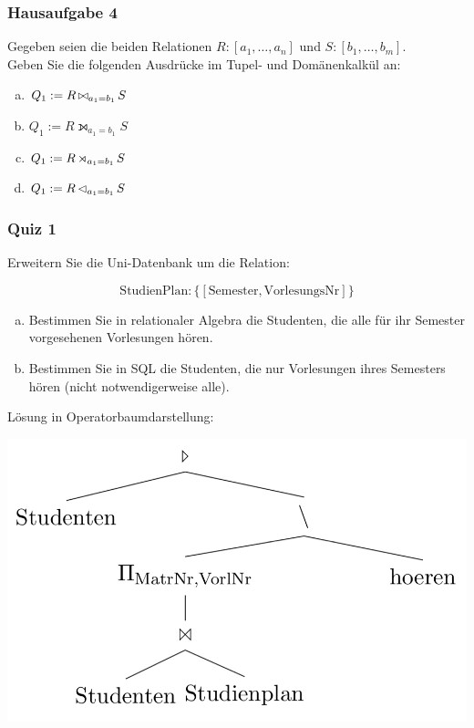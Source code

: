 \begin{frame}
	\frametitle{Hausaufgabe 4}
	\vspace{0.25cm}

	Gegeben seien die beiden Relationen \( R: {[a_1, \hdots, a_n]} \) und \( S: {[b_1, \hdots, b_m]} \). \\
	Geben Sie die folgenden Ausdrücke im Tupel- und Domänenkalkül an:
	\begin{enumerate}[a)]
		\item \( Q_1 := R \operatorname*{\bowtie}_{a_1 = b_1} S \)
		\item \( Q_1 := R \leftouterjoin_{a_1 = b_1} S \)
		\item \( Q_1 := R \operatorname*{\rtimes}_{a_1 = b_1} S \)
		\item \( Q_1 := R \operatorname*{\lhd}_{a_1 = b_1} S \)
	\end{enumerate}
\end{frame}

\begin{frame}[fragile]
	\frametitle{Quiz 1}
	\vspace{0.25cm}

	\begin{multicols}{2}
		Erweitern Sie die Uni-Datenbank um die Relation:

		\[ \text{StudienPlan}: \{ [\text{Semester}, \text{VorlesungsNr}] \} \]

		\begin{enumerate}[a)]
			\item<1-> Bestimmen Sie in relationaler Algebra die Studenten, die alle für ihr Semester
				vorgesehenen Vorlesungen hören.
			\item<3-> Bestimmen Sie in SQL die Studenten,
				die nur Vorlesungen ihres Semesters hören (nicht notwendigerweise alle).
		\end{enumerate}
		\vfill\columnbreak
		\pause

		Lösung in Operatorbaumdarstellung:
		\begin{center}
			\includegraphics[height=.3\paperheight]{./quiz1.png}
		\end{center}
	\end{multicols}

\end{frame}

